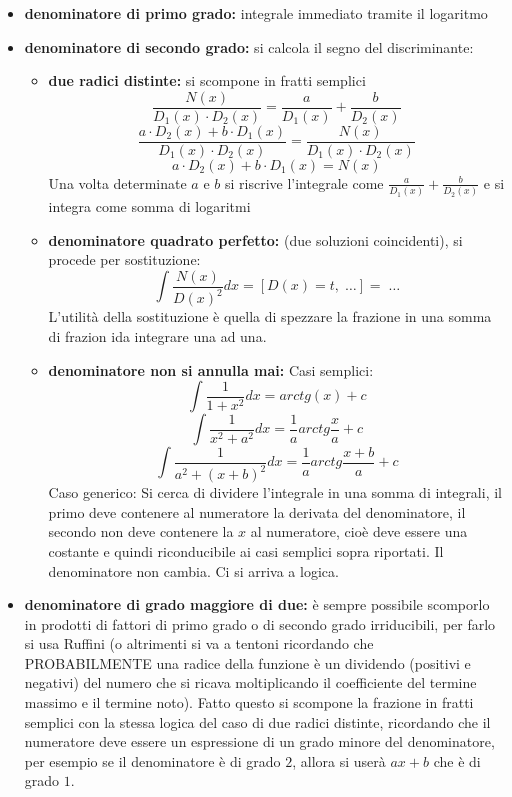 \begin{itemize}
    \item \textbf{denominatore di primo grado:} integrale immediato tramite il logaritmo
    \item \textbf{denominatore di secondo grado:} si calcola il segno del discriminante:
    \begin{itemize}
        \item \textbf{due radici distinte:} si scompone in fratti semplici
        \[
            \frac{N(x)}{D_1(x) \cdot D_2(x)} = \frac{a}{D_1(x)} + \frac{b}{D_2(x)}
        \]
        \[
            \frac{a \cdot D_2(x) + b \cdot D_1(x)}{D_1(x) \cdot  D_2(x)} = \frac{N(x)}{D_1(x) \cdot D_2(x)}
        \]
        \[
            a \cdot D_2(x) + b \cdot D_1(x)= N(x)
        \]
        Una volta determinate $a$ e $b$ si riscrive l'integrale come $\frac{a}{D_1(x)} + \frac{b}{D_2(x)}$ e si integra come somma di logaritmi
        \item \textbf{denominatore quadrato perfetto:} (due soluzioni coincidenti), si procede per sostituzione:
        \[
            \int \frac{N(x)}{D(x)^2} dx = [D(x) = t, \; \dots] = \; \dots
        \] 
        L'utilità della sostituzione è quella di spezzare la frazione in una somma di frazion ida integrare una ad una.
        \item \textbf{denominatore non si annulla mai:}\newline
        Casi semplici:
        \[
            \int \frac{1}{1 + x^2}dx = arctg (x) +c
        \]
        \[
            \int \frac{1}{x^2 + a^2}dx = \frac{1}{a} arctg \frac{x}{a} +c
        \]
        \[
            \int \frac{1}{a^2 + (x+b)^2}dx = \frac{1}{a} arctg \frac{x+b}{a} +c
        \]
        Caso generico: Si cerca di dividere l'integrale in una somma di integrali, il primo deve contenere al numeratore la derivata del denominatore, il secondo non deve contenere la $x$ al numeratore, cioè deve essere una costante e quindi riconducibile ai casi semplici sopra riportati. Il denominatore non cambia. Ci si arriva a logica. 
    \end{itemize}
    \item \textbf{denominatore di grado maggiore di due:} è sempre possibile scomporlo in prodotti di fattori di primo grado o di secondo grado irriducibili, per farlo si usa Ruffini (o altrimenti si va a tentoni ricordando che PROBABILMENTE una radice della funzione è un dividendo (positivi e negativi) del numero che si ricava moltiplicando il coefficiente del termine massimo e il termine noto).\newline
    Fatto questo si scompone la frazione in fratti semplici con la stessa logica del caso di due radici distinte, ricordando che il numeratore deve essere un espressione di un grado minore del denominatore, per esempio se il denominatore è di grado $2$, allora si userà $ax+b$ che è di grado $1$.
\end{itemize}
